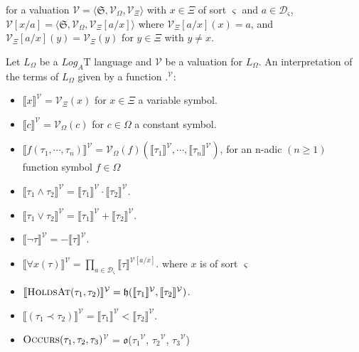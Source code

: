 for a valuation $\mathcal{V} = \langle \mathfrak{S}, \mathcal{V}_{\Omega}, \mathcal{V}_{\Xi} \rangle$ with
$x \in \Xi$ of sort $\varsigma$ and $a \in \mathcal{D}_{\varsigma}$, $\mathcal{V}[x/a] = \langle \mathfrak{S}, \mathcal{V}_{\Omega}, \mathcal{V}_{\Xi}[a/x] \rangle$
where $\mathcal{V}_{\Xi}[a/x](x) = a$, and $\mathcal{V}_{\Xi}[a/x](y) = \mathcal{V}_{\Xi}(y)$ for $y \in \Xi$ with $y \neq x$.

\begin{defn}
	Let $L_{\Omega}$ be a $Log_A$T language and $\mathcal{V}$ be a valuation for $L_{\Omega}$. An interpretation of the terms of $L_{\Omega}$ given by a function
	\textlbrackdbl .\textrbrackdbl$^{\mathcal{V}}$:
\end{defn}
\begin{itemize}
	\item $\llbracket x \rrbracket^{\mathcal{V}} = \mathcal{V}_{\Xi}(x)$ for $x \in \Xi$ a variable symbol.
	\item $\llbracket c \rrbracket^{\mathcal{V}} = \mathcal{V}_{\Omega}(c)$ for $c \in \Omega$ a constant symbol.
	\item $\llbracket f(\tau_1, \cdots, \tau_n) \rrbracket^{\mathcal{V}} = \mathcal{V}_{\Omega}(f)(\llbracket \tau_1 \rrbracket^{\mathcal{V}}, \cdots, \llbracket\tau_n \rrbracket^{\mathcal{V}})$,
	      for an n-adic $(n \geq 1)$ function symbol $f \in \Omega$
	\item $\llbracket \tau_1 \land \tau_2 \rrbracket^{\mathcal{V}} = \llbracket \tau_1 \rrbracket^{\mathcal{V}} \cdot \llbracket \tau_2 \rrbracket^{\mathcal{V}}$.
	\item $\llbracket \tau_1 \lor \tau_2 \rrbracket^{\mathcal{V}} = \llbracket \tau_1 \rrbracket^{\mathcal{V}} + \llbracket \tau_2 \rrbracket^{\mathcal{V}}$.
	\item $\llbracket \neg \tau \rrbracket^{\mathcal{V}} = - \llbracket \tau \rrbracket^{\mathcal{V}}$.
	\item $\llbracket \forall x(\tau) \rrbracket^{\mathcal{V}} = \prod_{a \in \mathcal{D}_{\varsigma}} \llbracket \tau \rrbracket^{\mathcal{V}[a/x]}$. where $x$ is of sort $\varsigma$
	\item $\llbracket \textsc{HoldsAt}(\tau_1, \tau_2)\rrbracket^{\mathcal{V}} = \mathfrak{h}(\llbracket \tau_1 \rrbracket^{\mathcal{V}}, \llbracket \tau_2 \rrbracket^{\mathcal{V}})$.
	\item $\llbracket (\tau_1 \prec \tau_2) \rrbracket^{\mathcal{V}} = \llbracket \tau_1 \rrbracket^{\mathcal{V}} < \llbracket \tau_2 \rrbracket^{\mathcal{V}}$.
	\item \textlbrackdbl $\textsc{Occurs}(\tau_1, \tau_2, \tau_3)$\textrbrackdbl$^{\mathcal{V}}$ = $\mathfrak{o}$(\textlbrackdbl $\tau_1$\textrbrackdbl$^{\mathcal{V}}$, \textlbrackdbl $\tau_2$\textrbrackdbl$^{\mathcal{V}}$, \textlbrackdbl$\tau_3$\textrbrackdbl$^{\mathcal{V}}$)

\end{itemize}
